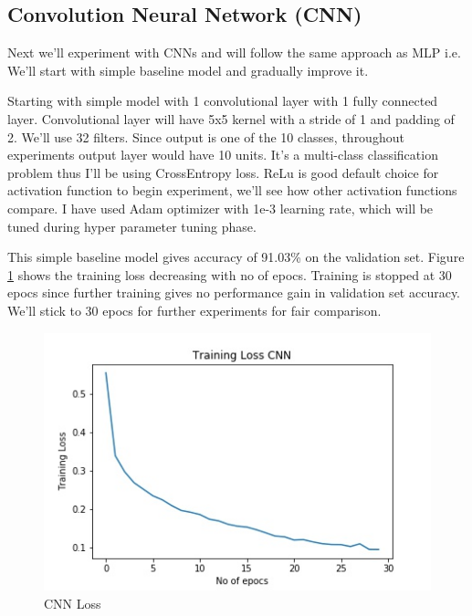 \documentclass[10pt,a4paper]{article}
\begin{document}
\subsection{Convolution Neural Network (CNN)}

Next we'll experiment with CNNs and will follow the same approach as MLP i.e. We'll start with simple baseline model and gradually improve it.

Starting with simple model with 1 convolutional layer with 1 fully connected layer. Convolutional layer will have 5x5 kernel with a stride of 1 and padding of 2. We'll use 32 filters. Since output is one of the 10 classes, throughout experiments output layer would have 10 units. It's a multi-class classification problem thus I'll be using CrossEntropy loss. ReLu is good default choice for activation function to begin experiment, we'll see how other activation functions compare. I have used Adam optimizer with 1e-3 learning rate, which will be tuned during hyper parameter tuning phase.

	This simple baseline model gives accuracy of 91.03\% on the validation set. Figure \ref{mlploss} shows the training loss decreasing with no of epocs. Training is stopped at 30 epocs since further training gives no performance gain in validation set accuracy. We'll stick to 30 epocs for further experiments for fair comparison. \\

\begin{figure}[h!]
\begin{center}
	\includegraphics[width=0.85\linewidth]{training_cnn.jpg}
	\caption{CNN Loss}
	\label{mlploss}
\end{center}
\end{figure}

\pagebreak
\end{document}
